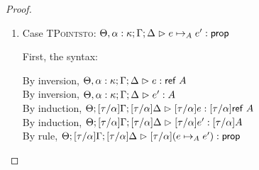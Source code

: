 \begin{proof}
\begin{enumerate}
  For the semantics, consider $\interp{\judgeA[\Theta; {[\tau/\alpha]}\Gamma; {[\tau/\alpha]}\Delta]{{[\tau/\alpha]}(p =_\omega q)}{\assert}}\;\theta\;\gamma\;\delta$
  \begin{eqnproof}
          {Semantics}
          {Induction}
          {Semantics}
  \end{eqnproof}
  The correctness of the application of $\gamma$ and $\delta$ follows from the equations for
  contexts under substitution. We also need to use the equality of sorts under substitution to
  justify forming the equality in the third line. 

\item Case \textsc{TPointsto}: $\judgeA[\Theta, \alpha:\kappa; \Gamma; \Delta]{e \pointsto_A e'}{\assert}$

  First, the syntax:
  \begin{tabbedproof}
    \oo By inversion, $\judgeA[\Theta, \alpha:\kappa; \Gamma; \Delta]{e}{\reftype{A}}$ \\
    \oo By inversion, $\judgeA[\Theta, \alpha:\kappa; \Gamma; \Delta]{e'}{A}$ \\
    \oo By induction, $\judgeA[\Theta; {[\tau/\alpha]}\Gamma; {[\tau/\alpha]}\Delta]{{[\tau/\alpha]}e}{{[\tau/\alpha]}\reftype{A}}$ \\
    \oo By induction, $\judgeA[\Theta; {[\tau/\alpha]}\Gamma; {[\tau/\alpha]}\Delta]{{[\tau/\alpha]}e'}{{[\tau/\alpha]}A}$ \\
    \oo By rule, $\judgeA[\Theta; {[\tau/\alpha]}\Gamma; {[\tau/\alpha]}\Delta]{{[\tau/\alpha]}(e \pointsto_A e')}{\assert}$
  \end{tabbedproof}


\end{enumerate}
\end{proof}
